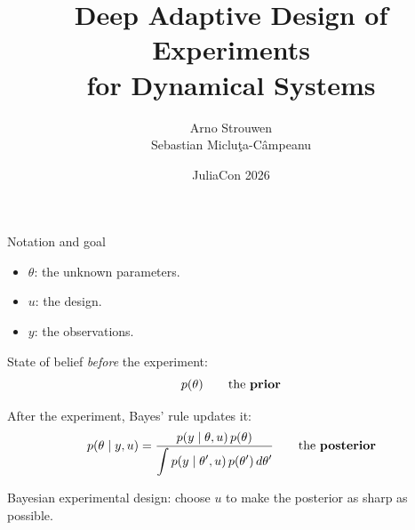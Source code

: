 \documentclass[aspectratio=169]{beamer}
\title{Deep Adaptive Design of Experiments\\for Dynamical Systems}
\author{Arno Strouwen \enspace {\footnotesize PumasAI \textperiodcentered\ KU Leuven} \\[0.5em]
        Sebastian Miclu\c{t}a-C\^ampeanu \enspace {\footnotesize JuliaHub \textperiodcentered\ University of Bucharest}}
\date{JuliaCon 2026}
\begin{document}
\begin{frame}
  \titlepage
\end{frame}


\begin{frame}{Notation and goal}
  \small
  \begin{itemize}\setlength{\itemsep}{0.3em}
    \item $\theta$: the unknown parameters.
    \item $u$: the design.
    \item $y$: the observations.
  \end{itemize}

  \vspace{0.4em}
  State of belief \emph{before} the experiment:
  \vspace{-0.3em}
  \[
    p(\theta) \qquad \text{the \textbf{prior}}
  \]

  After the experiment, Bayes' rule updates it:
  \vspace{-0.3em}
  \[
    p(\theta \mid y, u) = \frac{p(y \mid \theta, u)\,p(\theta)}
                               {\displaystyle\int p(y \mid \theta', u)\,p(\theta')\,d\theta'}
    \qquad \text{the \textbf{posterior}}
  \]

  \alert{Bayesian experimental design: choose $u$ to make the posterior as sharp as possible.}
\end{frame}
\end{document}
